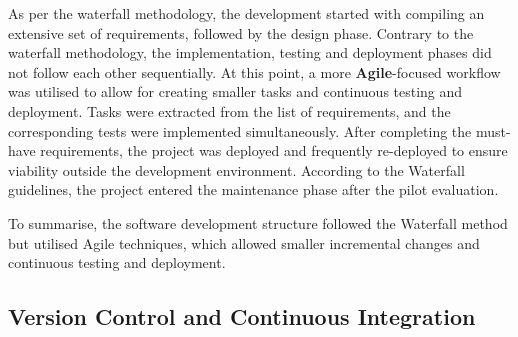 \documentclass{l4proj}
\begin{document}
As per the waterfall methodology, the development started with compiling an extensive set of requirements, followed by the design phase. Contrary to the waterfall methodology, the implementation, testing and deployment phases did not follow each other sequentially. At this point, a more \textbf{Agile}-focused workflow was utilised to allow for creating smaller tasks and continuous testing and deployment. Tasks were extracted from the list of requirements, and the corresponding tests were implemented simultaneously. After completing the must-have requirements, the project was deployed and frequently re-deployed to ensure viability outside the development environment. According to the Waterfall guidelines, the project entered the maintenance phase after the pilot evaluation.

To summarise, the software development structure followed the Waterfall method but utilised Agile techniques, which allowed smaller incremental changes and continuous testing and deployment.

\subsection{Version Control and Continuous Integration}

\end{document}
